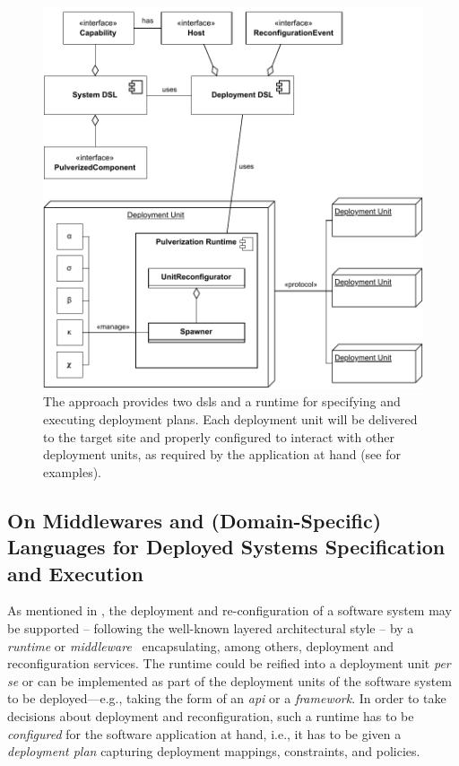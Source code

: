 \documentclass[conference]{IEEEtran}
\begin{document}
\begin{figure}
\includegraphics[width=\columnwidth]{figures/pulverization-framework-overview.drawio.pdf}
\caption{The approach provides two \acp{dsl} and a runtime for specifying and executing deployment plans. Each deployment unit will be delivered to the target site and properly configured to interact with other deployment units, as required by the application at hand (see   for examples).}
\label{fig:approach}
\end{figure}



\subsection{On Middlewares and (Domain-Specific) Languages for Deployed Systems Specification and Execution}
\label{sec:contrib:general}

As mentioned in ,
 the deployment and re-configuration of a software system
 may be supported -- following the well-known layered architectural style -- by a \emph{runtime} or \emph{middleware}~\cite{DBLP:journals/cacm/GazisK22}
 encapsulating, among others, deployment and reconfiguration services.
%
The runtime could be reified into a deployment unit \emph{per se}
 or can be implemented as part of the deployment units of the software system to be deployed---e.g., taking the form of an \emph{\ac{api}} or a \emph{framework}.
%
In order to take decisions about deployment and reconfiguration, 
 such a runtime has to be \emph{configured}
 for the software application at hand,
 i.e., it has to be given a \emph{deployment plan} capturing deployment mappings, constraints, and policies.
%
\end{document}
